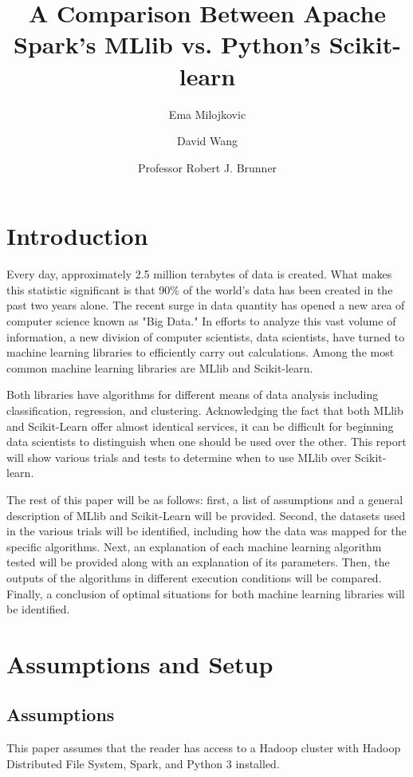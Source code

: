 \documentclass[9pt,twocolumn,twoside]{idsi}
\author[1]{Ema Milojkovic}
\author[1]{David Wang}
\author[1,2,3]{Professor Robert J. Brunner}
\affil[1]{University of Illinois at Urbana-Champaign}
\affil[2]{National Center for Supercomputing Applications}
\affil[3]{Laboratory for Computation, Data, and Machine Learning}
\title{A Comparison Between Apache Spark's MLlib vs. Python's Scikit-learn}
\begin{document}

\maketitle

\section{Introduction}
Every day, approximately 2.5 million terabytes of data is created. What makes this statistic significant is that 90\% of the world's data has been created in the past two years alone.\cite{ibm} The recent surge in data quantity has opened a new area of computer science known as "Big Data." In efforts to analyze this vast volume of information, a new division of computer scientists, data scientists, have turned to machine learning libraries to efficiently carry out calculations. Among the most common machine learning libraries are MLlib and Scikit-learn.

Both libraries have algorithms for different means of data analysis including classification, regression, and clustering. Acknowledging the fact that both MLlib and Scikit-Learn offer almost identical services, it can be difficult for beginning data scientists to distinguish when one should be used over the other. 
This report will show various trials and tests to determine when to use MLlib over Scikit-learn.

The rest of this paper will be as follows: first, a list of assumptions and a general description of MLlib and Scikit-Learn will be provided. Second, the datasets used in the various trials will be identified, including how the data was mapped for the specific algorithms. Next, an explanation of each machine learning algorithm tested will be provided along with an explanation of its parameters. Then, the outputs of the algorithms in different execution conditions will be compared. Finally, a conclusion of optimal situations for both machine learning libraries will be identified. 

\section{Assumptions and Setup}
\subsection{Assumptions}
This paper assumes that the reader has access to a Hadoop cluster with Hadoop Distributed File System, Spark, and Python 3 installed. 
\end{document}
